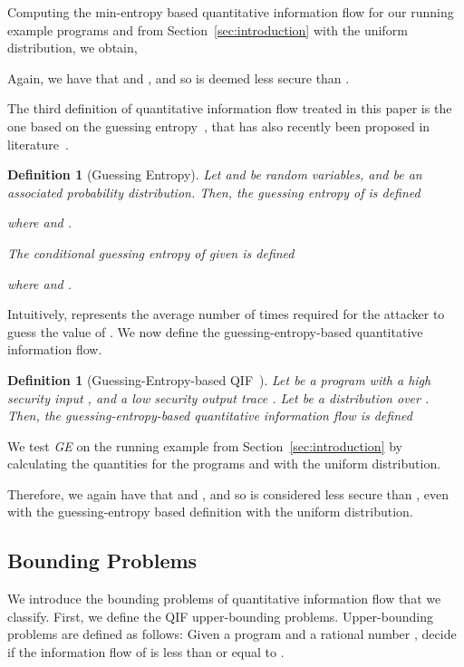 \documentclass[]{eptcs}
\newtheorem{definition}[theorem]{Definition}
\begin{document}
Computing the min-entropy based quantitative information flow for our
running example programs  and  from
Section~\ref{sec:introduction} with the uniform distribution, we
obtain,

Again, we have that  and , and so  is deemed less
secure than .

The third definition of quantitative information flow treated in this
paper is the one based on the guessing entropy~\cite{Massey94}, that
has also recently been proposed in
literature~\cite{kopf07,DBLP:conf/sp/BackesKR09}.
\begin{definition}[Guessing Entropy]
Let  and  be random variables, and  be an associated probability
distribution.  Then, the guessing entropy of  is defined

where  and
.

The conditional guessing entropy of  given  is defined

where  and .
\end{definition}

Intuitively,  represents the average number of
times required for the attacker to guess the value of .  We now
define the guessing-entropy-based quantitative information flow.

\begin{definition}[Guessing-Entropy-based
  QIF~\cite{kopf07,DBLP:conf/sp/BackesKR09}]
\label{def:ge}
Let  be a program with a high security input , and a low
security output trace .  Let  be a distribution over .
Then, the guessing-entropy-based quantitative information flow is
defined

\end{definition}

We test {\it GE} on the running example from
Section~\ref{sec:introduction} by calculating the quantities for the
programs  and  with the uniform distribution.  

Therefore, we again have that 
and , and so  is
considered less secure than , even with the guessing-entropy
based definition with the uniform distribution.

\subsection{Bounding Problems}
\label{subsec:bp}
We introduce the bounding problems of quantitative information flow
that we classify.  First, we define the QIF upper-bounding problems.
Upper-bounding problems are defined as follows: Given a program 
and a rational number , decide if the information flow of  is
less than or equal to .
\end{document}
